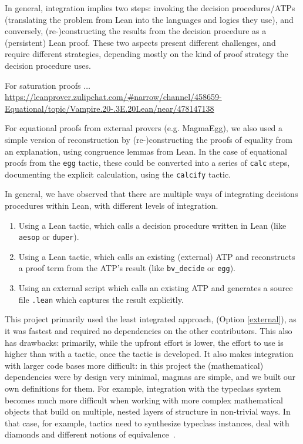 In general, integration implies two steps: invoking the decision procedures/ATPs (translating the problem from Lean into the languages and logics they use), and conversely, (re-)constructing the results from the decision procedure as a (persistent) Lean proof.
These two aspects present different challenges, and require different strategies, depending mostly on the kind of proof strategy the decision procedure uses.

For saturation proofs $\ldots$
\url{https://leanprover.zulipchat.com/#narrow/channel/458659-Equational/topic/Vampire.20-.3E.20Lean/near/478147138}

For equational proofs from external provers (e.g. MagmaEgg), we also used a simple version of reconstruction by (re-)constructing the proofs of equality from an explanation, using congruence lemmas from Lean.
In the case of equational proofs from the \texttt{egg} tactic, these could be converted into a series of \texttt{calc} steps, documenting the explicit calculation, using the \texttt{calcify} tactic.

In general, we have observed that there are multiple ways of integrating decisions procedures within Lean, with different levels of integration.
\begin{enumerate}
    \item Using a Lean tactic, which calls a decision procedure written in Lean (like \texttt{aesop} or \texttt{duper}).
    \item Using a Lean tactic, which calls an existing (external) ATP and reconstructs a proof term from the ATP's result (like \texttt{bv\_decide} or \texttt{egg}).
    \item\label{external} Using an external script which calls an existing ATP and generates a source file \texttt{.lean} which captures the result explicitly.
\end{enumerate}

This project primarily used the least integrated approach, (Option \ref{external}), as it was fastest and required no dependencies on the other contributors.
This also has drawbacks: primarily, while the upfront effort is lower, the effort to use is higher than with a tactic, once the tactic is developed.
It also makes integration with larger code bases more difficult: in this project the (mathematical) dependencies were by design very minimal, magmas are simple, and we built our own definitions for them.
For example, integration with the typeclass system becomes much more difficult when working with more complex mathematical objects that build on multiple, nested layers of structure in non-trivial ways.
In that case, for example, tactics need to synthesize typeclass instances, deal with diamonds and different notions of equivalence~\cite{DBLP:conf/mkm/Wieser23}.


